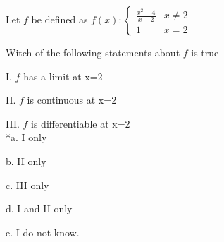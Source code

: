 
Let \(f\) be defined as 
$f(x): \begin{cases}
\frac{x^2-4}{x-2} & x \ne 2\\
1 & x=2
\end{cases}
$

Witch of the following statements about \(f\) is true

I. \(f\) has a limit at x=2

II. \(f\) is continuous at x=2

III. \(f\) is differentiable at x=2\\

*a. I only

b. II only

c. III only

d. I and II only

e. I do not know.\\
